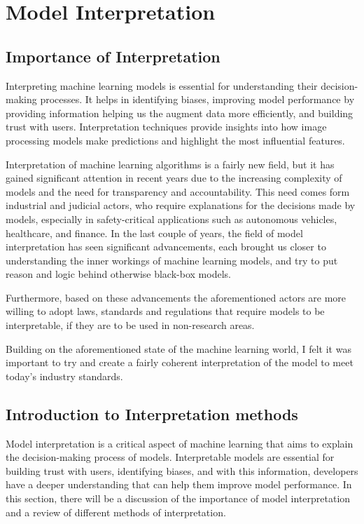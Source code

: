 
\section{Model Interpretation}\label{sec:model-interpretation}

\subsection{Importance of Interpretation}\label{subsec:importance-of-interpretation}

Interpreting machine learning models is essential for understanding their decision-making processes.
It helps in identifying biases, improving model performance by providing information helping us the augment data more efficiently, and building trust with users.
Interpretation techniques provide insights into how image processing models make predictions and highlight the most influential features.

Interpretation of machine learning algorithms is a fairly new field, but it has gained significant attention
in recent years due to the increasing complexity of models and the need for transparency and accountability.
This need comes form industrial and judicial actors, who require explanations for the decisions made by models,
especially in safety-critical applications such as autonomous vehicles, healthcare, and finance.
In the last couple of years, the field of model interpretation has seen significant advancements, each brought
us closer to understanding the inner workings of machine learning models, and try to put reason and logic behind
otherwise black-box models.

Furthermore, based on these advancements the aforementioned actors are more willing to adopt laws,
standards and regulations that require models to be interpretable,
if they are to be used in non-research areas.

Building on the aforementioned state of the machine learning world, I felt it was important to try
and create a fairly coherent interpretation of the model to meet today's industry standards.

\newpage
\subsection{Introduction to Interpretation methods}\label{subsec:introduction-to-interpretation-methods}

Model interpretation is a critical aspect of machine learning that aims to explain the decision-making process of models. %
Interpretable models are essential for building trust with users, identifying biases, and with this information,
developers have a deeper understanding that can help them improve model performance.
In this section, there will be a discussion of the importance of model interpretation and a review of different methods of interpretation.

